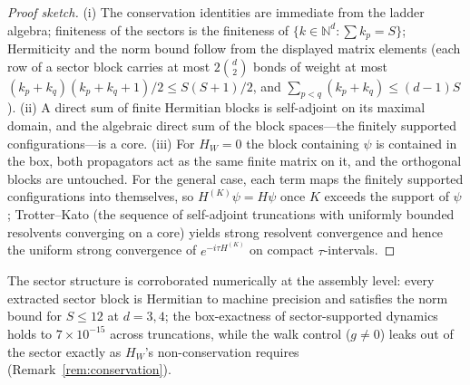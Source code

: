 \documentclass[11pt,a4paper]{article}
\theoremstyle{plain}
\theoremstyle{definition}
\theoremstyle{remark}
\newcommand{\Nn}{\mathbb{N}}
\begin{document}
\begin{proof}[Proof sketch]
(i) The conservation identities are immediate from the ladder algebra; finiteness of the
sectors is the finiteness of $\{k\in\Nn^{d}:\sum k_{p}=S\}$; Hermiticity and the norm bound
follow from the displayed matrix elements (each row of a sector block carries at most
$2\binom{d}{2}$ bonds of weight at most $(k_{p}+k_{q})(k_{p}+k_{q}+1)/2\leq S(S+1)/2$, and
$\sum_{p<q}(k_{p}+k_{q})\leq(d-1)S$). (ii) A direct sum of finite Hermitian blocks is
self-adjoint on its maximal domain, and the algebraic direct sum of the block spaces---the
finitely supported configurations---is a core. (iii) For $H_{W}=0$ the block containing
$\psi$ is contained in the box, both propagators act as the same finite matrix on it, and
the orthogonal blocks are untouched. For the general case, each term maps the finitely
supported configurations into themselves, so $H^{(K)}\psi=H\psi$ once $K$ exceeds the
support of $\psi$; Trotter--Kato (the sequence of self-adjoint truncations with uniformly
bounded resolvents converging on a core) yields strong resolvent convergence and hence the
uniform strong convergence of $e^{-i\tau H^{(K)}}$ on compact $\tau$-intervals.
\end{proof}

The sector structure is corroborated numerically at the assembly level: every extracted
sector block is Hermitian to machine precision and satisfies the norm bound for $S\leq12$
at $d=3,4$; the box-exactness of sector-supported dynamics holds to $7\times10^{-15}$
across truncations, while the walk control ($g\neq0$) leaks out of the sector exactly as
$H_{W}$'s non-conservation requires (Remark~\ref{rem:conservation}).
\end{document}
